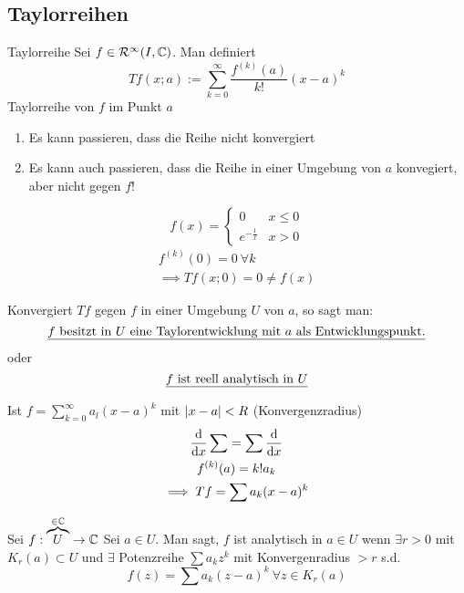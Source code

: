\subsection{Taylorreihen}
\begin{Def}{Taylorreihe}
  Sei $f\in \mathcal{R}^\infty(I,\mathbb{C})$. Man definiert
  \[Tf(x;a):=\sum^\infty_{k=0}\frac{f^{(k)}(a)}{k!}(x-a)^k\]
  Taylorreihe von $f$ im Punkt $a$
\end{Def}
\begin{Bem}
  \begin{enumerate}
    \item Es kann passieren, dass die Reihe nicht konvergiert
    \item Es kann auch passieren, dass die Reihe in einer Umgebung von $a$ konvegiert, aber nicht gegen $f$!
  \end{enumerate}
\end{Bem}
\begin{Bsp}
  \[f(x)=\begin{cases}
    0&x\leq 0\\
    e^{-\frac{1}{x}}&x>0
  \end{cases}\]
  \begin{gather*}
    f^{(k)}(0)=0 \ \forall k\\
    \implies Tf(x;0)=0\neq f(x)
  \end{gather*}
\end{Bsp}
\begin{Def}
  Konvergiert $Tf$ gegen $f$ in einer Umgebung $U$ von $a$, so sagt man: 
  \[\text{\underline{$f$ besitzt in $U$ eine Taylorentwicklung mit $a$ als Entwicklungspunkt.}}\]
  oder
  \[\text{\underline{$f$ ist reell analytisch in $U$}}\]
\end{Def}
\begin{Bew}
  Ist $f=\sum^\infty_{k=0}a_l(x-a)^k$ mit $\left| x-a \right|<R$ (Konvergenzradius)
  \begin{gather*}
    \displaystyle\frac{\mathrm{d}}{\mathrm{d}x}\sum=\sum\displaystyle\frac{\mathrm{d}}{\mathrm{d}x}\\
    f^{(k)}(a)=k!a_k\\
    \implies Tf=\sum a_k(x-a)^k
  \end{gather*}
\end{Bew}
\begin{Def}
  Sei $f:\overbrace{U}^{\in \mathbb{C}}\to\mathbb{C}$ Sei $a\in U$. Man sagt, $f$ ist analytisch in $a\in U$ wenn $\exists r>0$ mit $K_r(a)\subset U$ und $\exists$ Potenzreihe $\sum a_kz^k$ mit Konvergenradius $>r$ s.d.
  \[f(z)=\sum a_k(z-a)^k\ \forall z\in K_r(a)\]
\end{Def}
